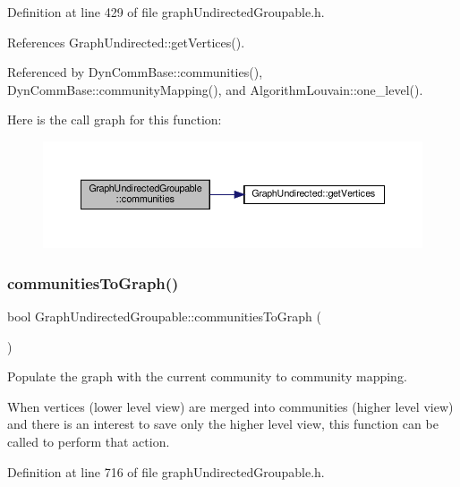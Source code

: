 Definition at line 429 of file graph\+Undirected\+Groupable.\+h.



References Graph\+Undirected\+::get\+Vertices().



Referenced by Dyn\+Comm\+Base\+::communities(), Dyn\+Comm\+Base\+::community\+Mapping(), and Algorithm\+Louvain\+::one\+\_\+level().

Here is the call graph for this function\+:
\nopagebreak
\begin{figure}[H]
\begin{center}
\leavevmode
\includegraphics[width=350pt]{classGraphUndirectedGroupable_a57f8ea4cff0d83b80cca2dc8e8e19ff6_cgraph}
\end{center}
\end{figure}
\mbox{\label{classGraphUndirectedGroupable_af6fc2c9e8aad7c6bce37d30eeaf184a8}} 
\subsubsection{\texorpdfstring{communities\+To\+Graph()}{communitiesToGraph()}}
{\footnotesize\ttfamily bool Graph\+Undirected\+Groupable\+::communities\+To\+Graph (\begin{DoxyParamCaption}{ }\end{DoxyParamCaption})\hspace{0.3cm}{\ttfamily [inline]}}



Populate the graph with the current community to community mapping. 

When vertices (lower level view) are merged into communities (higher level view) and there is an interest to save only the higher level view, this function can be called to perform that action.

Definition at line 716 of file graph\+Undirected\+Groupable.\+h.



